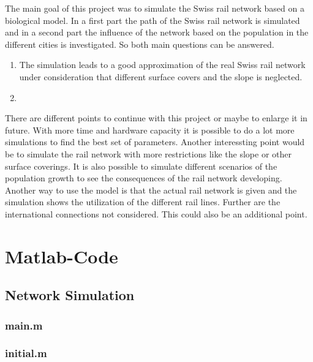 \documentclass[11pt]{scrartcl}
\begin{document}
The main goal of this project was to simulate the Swiss rail network based on a biological model. In a first part the path of the Swiss rail network is simulated and in a second part the influence of the network based on the population in the different cities  is investigated. So both main questions can be answered.

\begin{enumerate}
\item The simulation leads to a good approximation of the real Swiss rail network under consideration that different surface covers and the slope is neglected.
\item
\end{enumerate}


There are different points to continue with this project or maybe to enlarge it in future. With more time and hardware capacity it is possible to do a lot more simulations to find the best set of parameters. Another interessting point would be to simulate the rail network with more restrictions like the slope or other surface coverings. It is also possible to simulate different scenarios of the population growth to see the consequences of the rail network developing. Another way to use the model is that the actual rail network is given and the simulation shows the utilization of the different rail lines.
Further are the international connections not considered. This could also be an additional point.



\appendix
\section{Matlab-Code}

\subsection{Network Simulation}
\label{sec:network_simulation}

\subsubsection{main.m}



\null
\null

\subsubsection{initial.m}
\end{document}
